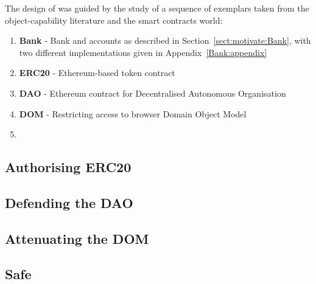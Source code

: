 


The design of \Chainmail was guided by the study of a sequence of
exemplars taken from the object-capability literature and the smart
contracts world:

\begin{enumerate}
\item \textbf{Bank} \cite{arnd18} - Bank and accounts as described in
Section~\ref{sect:motivate:Bank}, with two different implementations given in Appendix~\ref{Bank:appendix}
\item
\textbf{ERC20} \cite{ERC20} - Ethereum-based token contract
\item
\textbf{DAO} \cite{Dao,DaoBug} - Ethereum contract for Decentralised Autonomous
Organisation
\item
\textbf{DOM} \cite{dd,ddd} - Restricting access to browser Domain Object Model\\
\item
{}\\
\end{enumerate}\vspace{-1em}

\subsection{Authorising ERC20}
\label{sect:example:ERC20}
{}



\subsection{Defending the DAO}
\label{Dao:appendix}


\subsection{Attenuating the DOM}
\label{sect:example:DOM}


\subsection{Safe}
\label{sect:exampleSafe}


